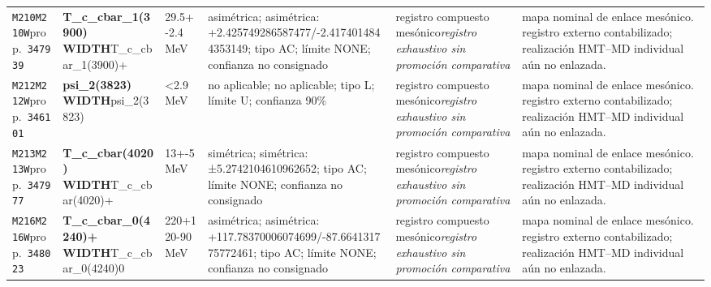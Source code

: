 \begin{landscape}
\begin{longtable}{L{1.85cm}L{4.45cm}L{2.35cm}L{4.05cm}L{3.35cm}L{7.15cm}}
\texttt{M210}\newline \texttt{M210W}\newline prop.\ \texttt{347939} & \textbf{T\_\allowbreak{}c\_\allowbreak{}cbar\_\allowbreak{}1(3900) WIDTH}\newline T\_\allowbreak{}c\_\allowbreak{}cbar\_\allowbreak{}1(3900)+ & 29.5+-2.4\,MeV & asimétrica; asimétrica: +2.425749286587477/-2.4174014844353149; tipo AC; límite NONE; confianza no consignado & registro compuesto mesónico\newline \emph{registro exhaustivo sin promoción comparativa} & mapa nominal de enlace mesónico. registro externo contabilizado; realización HMT--MD individual aún no enlazada. \\
\texttt{M212}\newline \texttt{M212W}\newline prop.\ \texttt{346101} & \textbf{psi\_\allowbreak{}2(3823) WIDTH}\newline psi\_\allowbreak{}2(3823) & \textless{}2.9\,MeV & no aplicable; no aplicable; tipo L; límite U; confianza 90\% & registro compuesto mesónico\newline \emph{registro exhaustivo sin promoción comparativa} & mapa nominal de enlace mesónico. registro externo contabilizado; realización HMT--MD individual aún no enlazada. \\
\texttt{M213}\newline \texttt{M213W}\newline prop.\ \texttt{347977} & \textbf{T\_\allowbreak{}c\_\allowbreak{}cbar(4020) WIDTH}\newline T\_\allowbreak{}c\_\allowbreak{}cbar(4020)+ & 13+-5\,MeV & simétrica; simétrica: ±5.2742104610962652; tipo AC; límite NONE; confianza no consignado & registro compuesto mesónico\newline \emph{registro exhaustivo sin promoción comparativa} & mapa nominal de enlace mesónico. registro externo contabilizado; realización HMT--MD individual aún no enlazada. \\
\texttt{M216}\newline \texttt{M216W}\newline prop.\ \texttt{348023} & \textbf{T\_\allowbreak{}c\_\allowbreak{}cbar\_\allowbreak{}0(4240)+ WIDTH}\newline T\_\allowbreak{}c\_\allowbreak{}cbar\_\allowbreak{}0(4240)0 & 220+120-90\,MeV & asimétrica; asimétrica: +117.78370006074699/-87.664131775772461; tipo AC; límite NONE; confianza no consignado & registro compuesto mesónico\newline \emph{registro exhaustivo sin promoción comparativa} & mapa nominal de enlace mesónico. registro externo contabilizado; realización HMT--MD individual aún no enlazada. \\

\end{longtable}
\end{landscape}
